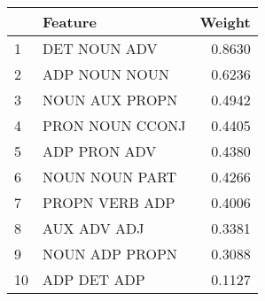 \begin{tabular}{llr}
\toprule
{} &          Feature &  Weight \\
\midrule
1  &     DET NOUN ADV &  0.8630 \\
2  &    ADP NOUN NOUN &  0.6236 \\
3  &   NOUN AUX PROPN &  0.4942 \\
4  &  PRON NOUN CCONJ &  0.4405 \\
5  &     ADP PRON ADV &  0.4380 \\
6  &   NOUN NOUN PART &  0.4266 \\
7  &   PROPN VERB ADP &  0.4006 \\
8  &      AUX ADV ADJ &  0.3381 \\
9  &   NOUN ADP PROPN &  0.3088 \\
10 &      ADP DET ADP &  0.1127 \\
\bottomrule
\end{tabular}
